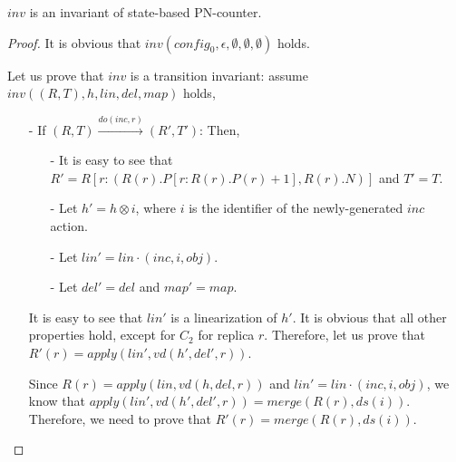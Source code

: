 {\begin{lemma}
\label{lemma:inv is an invariant of state-based CRDT for state-based PN-counter}
$\mathit{inv}$ is an invariant of state-based PN-counter.
\end{lemma}

\begin {proof}

It is obvious that $\mathit{inv}(\mathit{config}_0,\epsilon,\emptyset,\emptyset,\emptyset)$ holds.

Let us prove that $\mathit{inv}$ is a transition invariant: assume $\mathit{inv}((R,T),h,\mathit{lin},\mathit{del},\mathit{map})$ holds,

\begin{itemize}
\setlength{\itemsep}{0.5pt}
\item[-] If $(R,T) {\xrightarrow{\mathit{do}(\mathit{inc},r)}} (R',T')$: Then,

    \begin{itemize}
    \setlength{\itemsep}{0.5pt}
    \item[-] It is easy to see that $R' = R[ r: ( R(r).P[r: R(r).P(r)+1 ], R(r).N ) ]$ and $T' = T$.

    \item[-] Let $h' = h \otimes i$, where $i$ is the identifier of the newly-generated $\mathit{inc}$ action.

    \item[-] Let $\mathit{lin}' = \mathit{lin} \cdot (\mathit{inc},i,\mathit{obj})$.

    \item[-] Let $\mathit{del}' = \mathit{del}$ and $\mathit{map}' = \mathit{map}$.
    \end{itemize}

    It is easy to see that $\mathit{lin}'$ is a linearization of $h'$. It is obvious that all other properties hold, except for $C_2$ for replica $r$. Therefore, let us prove that $R'(r) = \mathit{apply}(\mathit{lin}',\mathit{vd}(h',\mathit{del}',r))$.

    Since $R(r) = \mathit{apply}(\mathit{lin},\mathit{vd}(h,\mathit{del},r))$ and $\mathit{lin}' = \mathit{lin} \cdot (\mathit{inc},i,\mathit{obj})$, we know that $\mathit{apply}(\mathit{lin}',\mathit{vd}(h',\mathit{del}',r)) = \mathit{merge}(R(r),\mathit{ds}(i))$. Therefore, we need to prove that $R'(r) = \mathit{merge}(R(r),\mathit{ds}(i))$.


\end{itemize}
\end{proof}}
